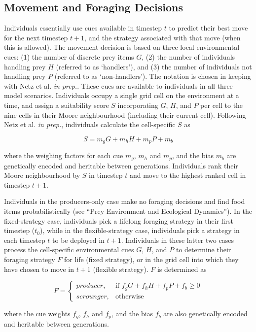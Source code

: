 \documentclass[11pt]{article}
\begin{document}
\subsection*{Movement and Foraging Decisions}

Individuals essentially use cues available in timestep $t$ to predict their best move for the next timestep $t+1$, and the strategy associated with that move (when this is allowed).
The movement decision is based on three local environmental cues: (1) the number of discrete prey items $G$, (2) the number of individuals handling  prey $H$ (referred to as `handlers'), and (3) the number of individuals not handling prey $P$ (referred to as `non-handlers').
The notation is chosen in keeping with Netz et al. \textit{in prep.}.
These cues are available to individuals in all three model scenarios.
Individuals occupy a single grid cell on the environment at a time, and assign a suitability score $S$ incorporating $G$, $H$, and $P$ per cell to the nine cells in their Moore neighbourhood (including their current cell).
Following Netz et al. \textit{in prep.}, individuals calculate the cell-specific $S$ as
\begin{linenomath*}
    \begin{equation*}
        S = m_gG + m_hH + m_pP + m_b
    \end{equation*}
\end{linenomath*}
where the weighing factors for each cue $m_g$, $m_h$ and $m_p$, and the bias $m_b$ are genetically encoded and heritable between generations.
Individuals rank their Moore neighbourhood by $S$ in timestep $t$ and move to the highest ranked cell in timestep $t+1$.

Individuals in the producers-only case make no foraging decisions and find food items probabilistically (see ``Prey Environment and Ecological Dynamics'').
In the fixed-strategy case, individuals pick a lifelong foraging strategy in their first timestep ($t_0$), while in the flexible-strategy case, individuals pick a strategy in each timestep $t$ to be deployed in $t+1$.
Individuals in these latter two cases process the cell-specific environmental cues $G$, $H$, and $P$ to determine their foraging strategy $F$ for life (fixed strategy), or in the grid cell into which they have chosen to move in $t+1$ (flexible strategy).
$F$ is determined as
\begin{linenomath*}
    \begin{equation*}
        F = 
    \begin{cases}
        {producer},& \text{if } f_gG + f_hH + f_pP + f_b \geq 0\\
        {scrounger},              & \text{otherwise}
    \end{cases}
    \end{equation*}
\end{linenomath*}
where the cue weights $f_g$, $f_h$ and $f_p$, and the bias $f_b$ are also genetically encoded and heritable between generations.
\end{document}
